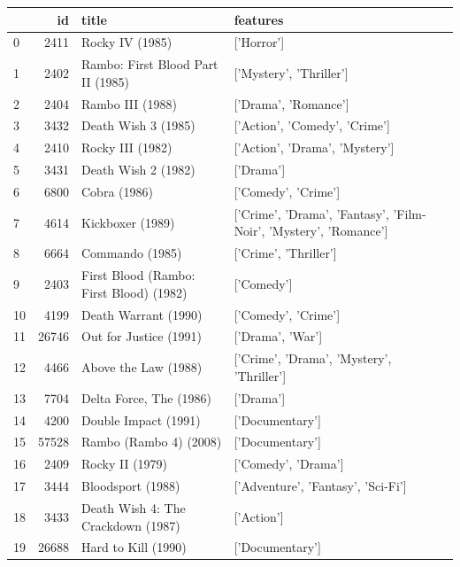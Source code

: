 
\begin{tabular}{lrll}
\toprule
 & id & title & features \\
\midrule
0 & 2411 & Rocky IV (1985) & ['Horror'] \\
1 & 2402 & Rambo: First Blood Part II (1985) & ['Mystery', 'Thriller'] \\
2 & 2404 & Rambo III (1988) & ['Drama', 'Romance'] \\
3 & 3432 & Death Wish 3 (1985) & ['Action', 'Comedy', 'Crime'] \\
4 & 2410 & Rocky III (1982) & ['Action', 'Drama', 'Mystery'] \\
5 & 3431 & Death Wish 2 (1982) & ['Drama'] \\
6 & 6800 & Cobra (1986) & ['Comedy', 'Crime'] \\
7 & 4614 & Kickboxer (1989) & ['Crime', 'Drama', 'Fantasy', 'Film-Noir', 'Mystery', 'Romance'] \\
8 & 6664 & Commando (1985) & ['Crime', 'Thriller'] \\
9 & 2403 & First Blood (Rambo: First Blood) (1982) & ['Comedy'] \\
10 & 4199 & Death Warrant (1990) & ['Comedy', 'Crime'] \\
11 & 26746 & Out for Justice (1991) & ['Drama', 'War'] \\
12 & 4466 & Above the Law (1988) & ['Crime', 'Drama', 'Mystery', 'Thriller'] \\
13 & 7704 & Delta Force, The (1986) & ['Drama'] \\
14 & 4200 & Double Impact (1991) & ['Documentary'] \\
15 & 57528 & Rambo (Rambo 4) (2008) & ['Documentary'] \\
16 & 2409 & Rocky II (1979) & ['Comedy', 'Drama'] \\
17 & 3444 & Bloodsport (1988) & ['Adventure', 'Fantasy', 'Sci-Fi'] \\
18 & 3433 & Death Wish 4: The Crackdown (1987) & ['Action'] \\
19 & 26688 & Hard to Kill (1990) & ['Documentary'] \\
\bottomrule
\end{tabular}
